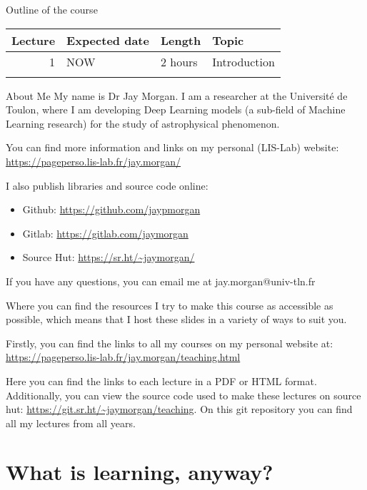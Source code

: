 \documentclass[10pt]{beamer}
\begin{document}
\begin{frame}[label={sec:org6e38224}]{Outline of the course}
\begin{center}
\begin{tabular}{rlll}
Lecture & Expected date & Length & Topic\\
\hline
1 & NOW & 2 hours & Introduction\\
 &  &  & \\
\end{tabular}
\end{center}
\end{frame}

\begin{frame}[label={sec:org02cc03a}]{About Me}
My name is Dr Jay Morgan. I am a researcher at the Université de Toulon, where I am
developing Deep Learning models (a sub-field of Machine Learning research) for the
study of astrophysical phenomenon.

You can find more information and links on my personal (LIS-Lab) website:
\url{https://pageperso.lis-lab.fr/jay.morgan/}

I also publish libraries and source code online:
\begin{itemize}
\item Github: \url{https://github.com/jaypmorgan}
\item Gitlab: \url{https://gitlab.com/jaymorgan}
\item Source Hut: \url{https://sr.ht/\~jaymorgan/}
\end{itemize}

If you have any questions, you can email me at jay.morgan@univ-tln.fr
\end{frame}

\begin{frame}[label={sec:orgbdeaf2f}]{Where you can find the resources}
I try to make this course as accessible as possible, which means that I host these
slides in a variety of ways to suit you.

Firstly, you can find the links to all my courses on my personal website at:
\url{https://pageperso.lis-lab.fr/jay.morgan/teaching.html}

Here you can find the links to each lecture in a PDF or HTML format. Additionally,
you can view the source code used to make these lectures on source hut:
\url{https://git.sr.ht/\~jaymorgan/teaching}. On this git repository you can find all my
lectures from all years.
\end{frame}

\section*{What is learning, anyway?}
\label{sec:org71ca252}
\end{document}
